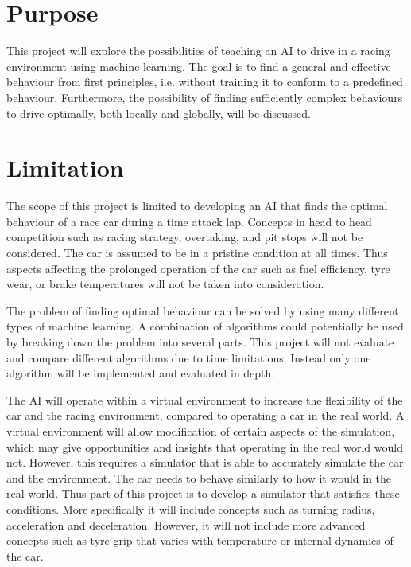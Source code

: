 \section{Purpose}
This project will explore the possibilities of teaching an AI to drive in a racing environment using machine learning. The goal is to find a general and effective behaviour from first principles, i.e. without training it to conform to a predefined behaviour. Furthermore, the possibility of finding sufficiently complex behaviours to drive optimally, both locally and globally, will be discussed. 

\section{Limitation}

The scope of this project is limited to developing an AI that finds the optimal behaviour of a race car during a time attack lap. Concepts in head to head competition such as racing strategy, overtaking, and pit stops will not be considered. The car is assumed to be in a pristine condition at all times. Thus aspects affecting the prolonged operation of the car such as fuel efficiency, tyre wear, or brake temperatures will not be taken into consideration. 

The problem of finding optimal behaviour can be solved by using many different types of machine learning. A combination of algorithms could potentially be used by breaking down the problem into several parts. This project will not evaluate and compare different algorithms due to time limitations. Instead only one algorithm will be implemented and evaluated in depth. 

The AI will operate within a virtual environment to increase the flexibility of the car and the racing environment, compared to operating a car in the real world. A virtual environment will allow modification of certain aspects of the simulation, which may give opportunities and insights that operating in the real world would not. However, this requires a simulator that is able to accurately simulate the car and the environment. The car needs to behave similarly to how it would in the real world. Thus part of this project is to develop a simulator that satisfies these conditions. More specifically it will include concepts such as turning radius, acceleration and deceleration. However, it will not include more advanced concepts such as tyre grip that varies with temperature or internal dynamics of the car.


